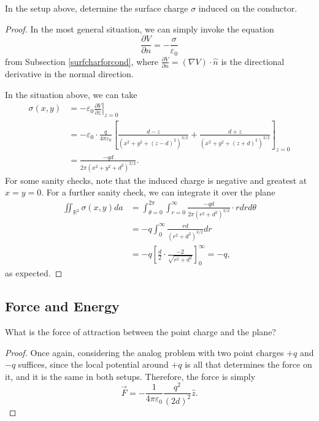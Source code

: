 \begin{example}\label{pointconductingplanecharge}
In the setup above, determine the surface charge $\sigma$ induced on the conductor.
\end{example}

\begin{proof}
In the most general situation, we can simply invoke the equation
\[\frac{\partial V}{\partial n}=-\frac{\sigma}{\varepsilon_0}\]
from Subsection \ref{surfcharforcond}, where $\frac{\partial V}{\partial n}=(\nabla V)\cdot\hat{n}$ is the directional derivative in the normal direction.

In the situation above, we can take
\begin{align*}
\sigma(x,y)&=-\varepsilon_0\left.\frac{\partial V}{\partial z}\right\rvert_{z=0}\\
&=-\varepsilon_0\cdot \frac{q}{4\pi\varepsilon_0}\left[\frac{d-z}{(x^2+y^2+(z-d)^2)^{3/2}}+\frac{d+z}{(x^2+y^2+(z+d)^2)^{3/2}}\right]_{z=0}\\
&=\boxed{\frac{-qd}{2\pi(x^2+y^2+d^2)^{3/2}}}.
\end{align*}
For some sanity checks, note that the induced charge is negative and greatest at $x=y=0$. For a further sanity check, we can integrate it over the plane
\begin{align*}
    \iint_{\mathbb{R}^2}\sigma(x,y)da&=\int_{\theta=0}^{2\pi}\int_{r=0}^\infty \frac{-qd}{2\pi(r^2+d^2)^{3/2}}\cdot rdrd\theta\\
    &=-q\int_{0}^\infty\frac{rd}{(r^2+d^2)^{3/2}}dr\\
    &=-q\left[\frac{d}{2}\cdot \frac{-2}{\sqrt{r^2+d^2}}\right]_0^\infty=-q,
\end{align*}
as expected.

\end{proof}

\subsection{Force and Energy}

\begin{example}
What is the force of attraction between the point charge and the plane?
\end{example}

\begin{proof}
Once again, considering the analog problem with two point charges $+q$ and $-q$ suffices, since the local potential around $+q$ is all that determines the force on it, and it is the same in both setups. Therefore, the force is simply
\[\vec{F}=-\frac{1}{4\pi\varepsilon_0}\frac{q^2}{(2d)^2}\hat{z}.\]
\end{proof}

